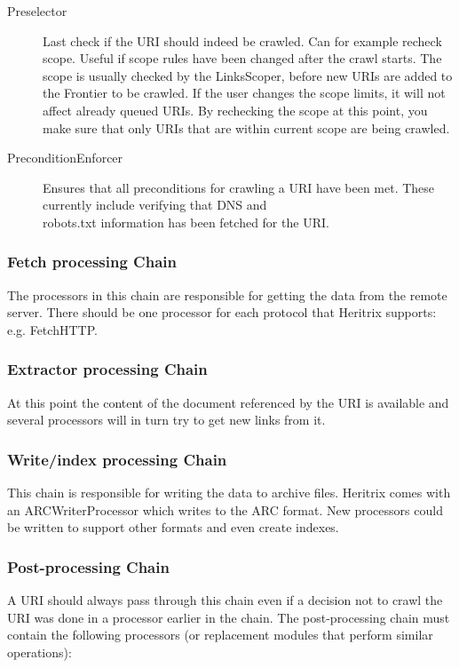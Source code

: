 \documentclass[11pt,a4paper]{article}
\begin{document}
\begin{description}
\item[Preselector] Last check if the URI should indeed be crawled. Can for example recheck scope. Useful if scope rules have been changed after the crawl starts. The scope is usually checked by the LinksScoper, before new URIs are added to the Frontier to be crawled. If the user changes the scope limits, it will not affect already queued URIs. By rechecking the scope at this point, you make sure that only URIs that are within current scope are being crawled.
\item[PreconditionEnforcer] Ensures that all preconditions for crawling a URI have been met. These currently include verifying that DNS and \\robots.txt information has been fetched for the URI.
\end{description}

\subsubsection{Fetch processing Chain}
The processors in this chain are responsible for getting the data from the remote server. There should be one processor for each protocol that Heritrix supports: e.g. FetchHTTP.

\subsubsection{Extractor processing Chain}
At this point the content of the document referenced by the URI is available and several processors will in turn try to get new links from it.

\subsubsection{Write/index processing Chain}
This chain is responsible for writing the data to archive files. Heritrix comes with an ARCWriterProcessor which writes to the ARC format. New processors could be written to support other formats and even create indexes.

\subsubsection{Post-processing Chain}
A URI should always pass through this chain even if a decision not to crawl the URI was done in a processor earlier in the chain. The post-processing chain must contain the following processors (or replacement modules that perform similar operations):
\end{document}
